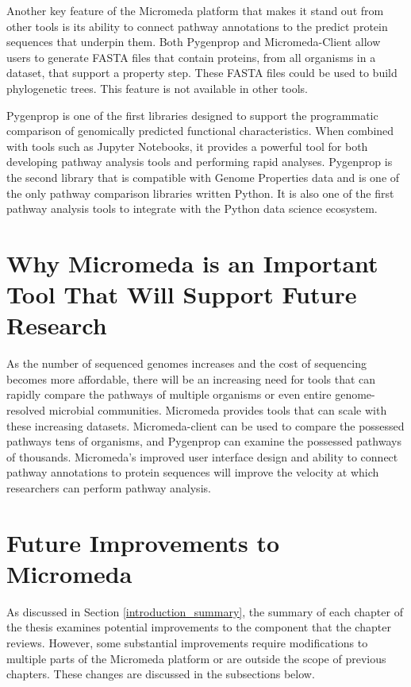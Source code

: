Another key feature of the Micromeda platform that makes it stand out from other 
tools is its ability to connect pathway annotations to the predict protein 
sequences that underpin them. Both Pygenprop and Micromeda-Client allow users to 
generate FASTA files that contain proteins, from all organisms in a dataset, 
that support a property step. These FASTA files could be used to build 
phylogenetic trees. This feature is not available in other tools.

Pygenprop is one of the first libraries designed to support the programmatic 
comparison of genomically predicted functional characteristics. When combined 
with tools such as Jupyter Notebooks, it provides a powerful tool for both 
developing pathway analysis tools and performing rapid analyses. Pygenprop is 
the second library that is compatible with Genome Properties data and is one of 
the only pathway comparison libraries written Python. It is also one of the 
first pathway analysis tools to integrate with the Python data science 
ecosystem.

\section{Why Micromeda is an Important Tool That Will Support Future Research}

As the number of sequenced genomes increases and the cost of sequencing becomes 
more affordable, there will be an increasing need for tools that can rapidly 
compare the pathways of multiple organisms or even entire genome-resolved 
microbial communities. Micromeda provides tools that can scale with these 
increasing datasets. Micromeda-client can be used to compare the possessed 
pathways tens of organisms, and Pygenprop can examine the possessed pathways of 
thousands. Micromeda's improved user interface design and ability to connect 
pathway annotations to protein sequences will improve the velocity at which 
researchers can perform pathway analysis.

\section{Future Improvements to Micromeda}

As discussed in Section \ref{introduction_summary}, the summary of each chapter 
of the thesis examines potential improvements to the component that the chapter 
reviews. However, some substantial improvements require modifications to 
multiple parts of the Micromeda platform or are outside the scope of previous 
chapters. These changes are discussed in the subsections below.

